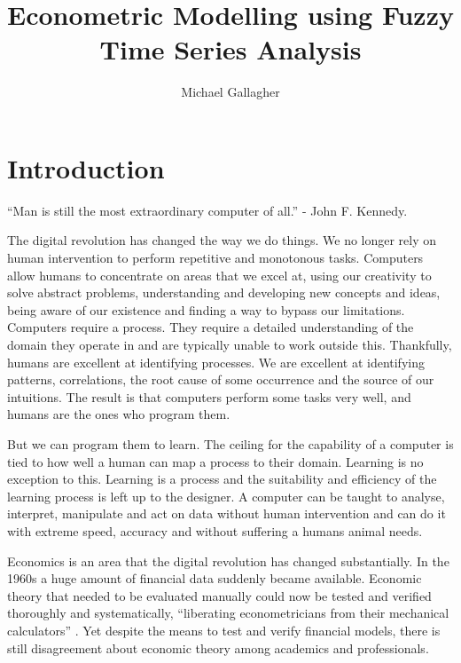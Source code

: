 \documentclass[12pt]{article}
\title{Econometric Modelling using Fuzzy Time Series Analysis}
\author{Michael Gallagher}
\theoremstyle{definition}
\begin{document}
\maketitle



\tableofcontents

\section{Introduction}

``Man is still the most extraordinary computer of all.'' - John F. Kennedy.

The digital revolution has changed the way we do things. We no longer rely on human intervention to perform repetitive and monotonous tasks. Computers allow humans to concentrate on areas that we excel at, using our creativity to solve abstract problems, understanding and developing new concepts and ideas, being aware of our existence and finding a way to bypass our limitations. Computers require a process. They require a detailed understanding of the domain they operate in and are typically unable to work outside this. Thankfully, humans are excellent at identifying processes. We are excellent at identifying patterns, correlations, the root cause of some occurrence and the source of our intuitions. The result is that computers perform some tasks very well, and humans are the ones who program them.

But we can program them to learn. The ceiling for the capability of a computer is tied to how well a human can map a process to their domain. Learning is no exception to this. Learning is a process \citep{rescorla1988pavlovian} and the suitability and efficiency of the learning process is left up to the designer. A computer can be taught to analyse, interpret, manipulate and act on data without human intervention and can do it with extreme speed, accuracy and without suffering a humans animal needs.

Economics is an area that the digital revolution has changed substantially. In the 1960s a huge amount of financial data suddenly became available. Economic theory that needed to be evaluated manually could now be tested and verified thoroughly and systematically, ``liberating econometricians from their mechanical calculators'' \citep{fama}. Yet despite the means to test and verify financial models, there is still disagreement about economic theory among academics and professionals.
\end{document}
